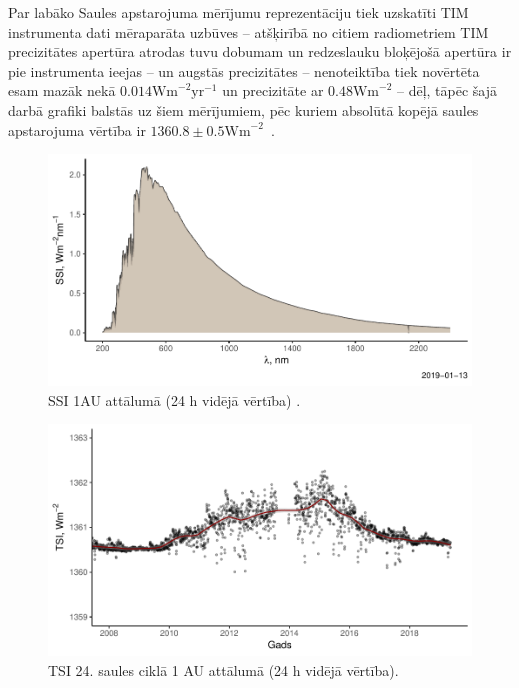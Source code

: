 Par labāko Saules apstarojuma mērījumu reprezentāciju tiek uzskatīti TIM instrumenta dati mēraparāta uzbūves -- atšķirībā no citiem radiometriem TIM precizitātes apertūra atrodas tuvu dobumam un redzeslauku bloķējošā apertūra ir pie instrumenta ieejas -- un augstās precizitātes -- nenoteiktība tiek novērtēta esam mazāk nekā $0.014\textrm{Wm}^{-2}\textrm{yr}^{-1}$ un precizitāte ar $0.48\textrm{Wm}^{-2}$ \cite{TSIdata} -- dēļ, tāpēc šajā darbā grafiki balstās uz šiem mērījumiem, pēc kuriem absolūtā kopējā saules apstarojuma vērtība ir $1360.8 \pm 0.5 \textrm{Wm}^{-2}$~\cite{Frohlich2012}.

\begin{figure}[h]
    \centering
    \includegraphics[width=\linewidth]{figures/misc/SSI.pdf}
    \caption{SSI 1AU attālumā (24 h vidējā vērtība) \cite{SSIdata}.}
    \label{fig:SSI}
\end{figure}

\begin{figure}[h]
    \centering
    \includegraphics[width=\linewidth]{figures/misc/TSI_8-19.pdf}
    \caption{TSI 24. saules ciklā 1 AU attālumā (24 h vidējā vērtība)\cite{TSIdata}.}
    \label{fig:TSI1}
\end{figure}

